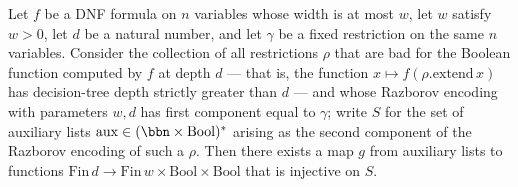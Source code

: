 \begin{lemma}
\label{SwitchingLemma.exists_aux_injection}
\leanok
{}
Let $f$ be a DNF formula on $n$ variables whose width is at most $w$, let $w$ satisfy $w
> 0$, let $d$ be a natural number, and let $\gamma$ be a fixed restriction on the same
$n$ variables. Consider the collection of all restrictions $\rho$ that are bad for the
Boolean function computed by $f$ at depth $d$ — that is, the function $x \mapsto
f(\rho.\mathrm{extend}\,x)$ has decision-tree depth strictly greater than $d$ — and
whose Razborov encoding with parameters $w,d$ has first component equal to $\gamma$;
write $S$ for the set of auxiliary lists $\mathrm{aux} \in (\bbn \times
\mathrm{Bool})^{*}$ arising as the second component of the Razborov encoding of such a
$\rho$. Then there exists a map $g$ from auxiliary lists to functions $\mathrm{Fin}\,d
\to \mathrm{Fin}\,w \times \mathrm{Bool} \times \mathrm{Bool}$ that is injective on $S$.
\end{lemma}

